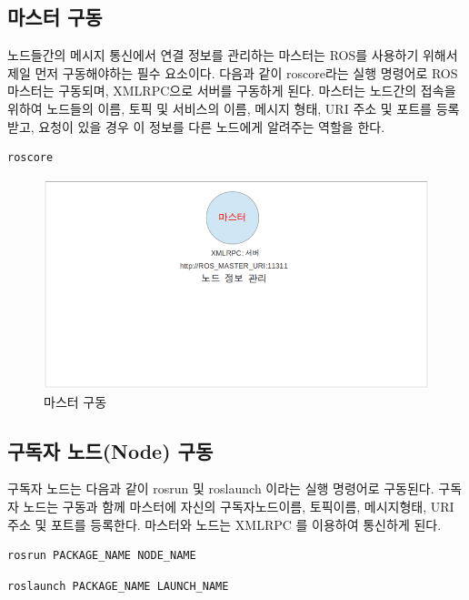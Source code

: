 \subsection{마스터 구동}

노드들간의 메시지 통신에서 연결 정보를 관리하는 마스터는 ROS를 사용하기 위해서 제일 먼저 구동해야하는 필수 요소이다. 다음과 같이 roscore라는 실행 명령어로 ROS 마스터는 구동되며, XMLRPC으로 서버를 구동하게 된다. 마스터는 노드간의 접속을 위하여 노드들의 이름, 토픽 및 서비스의 이름, 메시지 형태, URI 주소 및 포트를  등록받고, 요청이 있을 경우 이 정보를 다른 노드에게 알려주는 역할을 한다.

\begin{lstlisting}[language=bash]
roscore
\end{lstlisting}

\begin{figure}[h]
\centering\includegraphics[width=0.6\columnwidth]{pictures/chapter4/notion1.png}
\caption{마스터 구동}
\end{figure}

\subsection{구독자 노드(Node) 구동}
 
구독자 노드는 다음과 같이 rosrun 및 roslaunch 이라는 실행 명령어로 구동된다. 구독자 노드는 구동과 함께 마스터에 자신의 구독자노드이름, 토픽이름, 메시지형태, URI 주소 및 포트를 등록한다. 마스터와 노드는 XMLRPC 를 이용하여 통신하게 된다.

\begin{lstlisting}[language=bash]
rosrun PACKAGE_NAME NODE_NAME
\end{lstlisting}

\begin{lstlisting}[language=bash]
roslaunch PACKAGE_NAME LAUNCH_NAME
\end{lstlisting}

